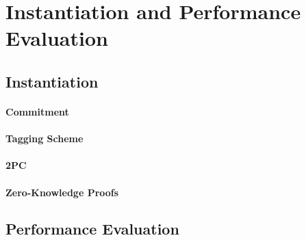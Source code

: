 
\section{Instantiation and Performance Evaluation}

\subsection{Instantiation}

\paragraph{Commitment}

\paragraph{Tagging Scheme}

\paragraph{2PC}

\paragraph{Zero-Knowledge Proofs}

\subsection{Performance Evaluation}

% 
